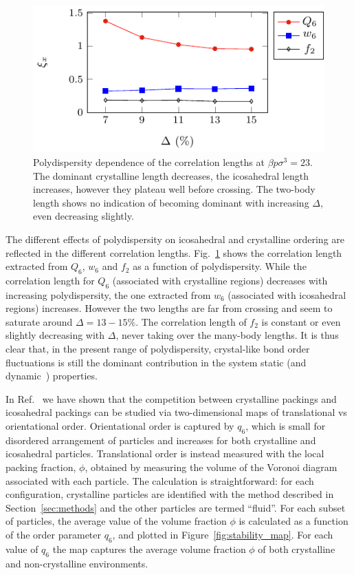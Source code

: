\documentclass[twocolumn,superscriptaddress]{revtex4}
\begin{document}
\begin{figure}
 \centering
 \includegraphics{fig_lengthpoly}
	\caption{Polydispersity dependence of the correlation lengths at $\beta p\sigma^3=23$. The dominant crystalline length decreases, the icosahedral length increases, however they plateau well before crossing. The two-body length shows no indication of becoming dominant with increasing $\Delta$, even decreasing slightly.}
	\label{fig:lengthpoly}
\end{figure}

The different effects of polydispersity on icosahedral and crystalline ordering are reflected in the different correlation lengths.
Fig.~\ref{fig:lengthpoly} shows the correlation length extracted from $Q_6$, $w_6$ and $f_2$ as a function of polydispersity. While the correlation length for $Q_6$ (associated with crystalline regions) decreases with increasing polydispersity, the one extracted from $w_6$ (associated with icosahedral regions) increases.
However the two lengths are far from crossing and seem to saturate around $\Delta=13-15\%$. The correlation length of $f_2$ is constant or even slightly decreasing with $\Delta$, never taking over the many-body lengths. It is thus clear that, in the present range of polydispersity, crystal-like bond order fluctuations is still the dominant contribution in the system static (and dynamic~\cite{mathieu_icosahedra}) properties.

In Ref.~\cite{russo_hs} we have shown that the competition between crystalline packings and
icosahedral packings can be studied via two-dimensional maps of translational vs orientational order.
Orientational order is captured by $q_6$, which is small for disordered arrangement of particles and
increases for both crystalline and icosahedral particles. Translational order is instead measured with
the local packing fraction, $\phi$, obtained by measuring the volume of the Voronoi diagram associated with
each particle. The calculation is straightforward: for each
configuration, crystalline particles are identified with the method described in Section~\ref{sec:methods} and the other particles are termed ``fluid''. For each subset of particles, the average value of the volume fraction $\phi$ is calculated as a function of the order parameter $q_6$, and plotted in Figure~\ref{fig:stability_map}.
For each value of $q_6$ the map captures the average volume fraction $\phi$ of both crystalline and non-crystalline
environments.
\end{document}
